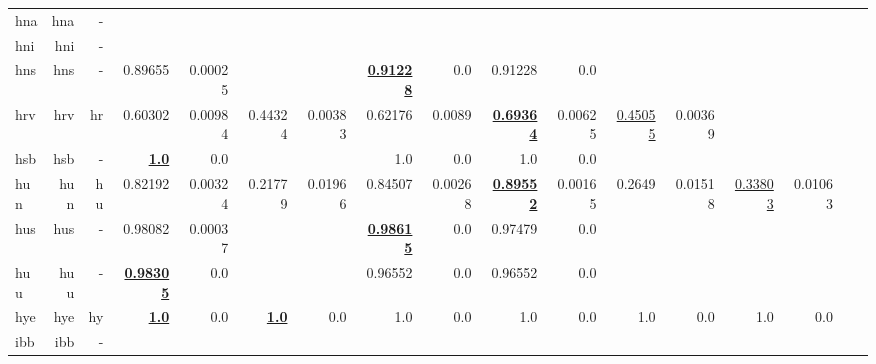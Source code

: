 \documentclass[11pt]{article}
\begin{document}
\begin{table*}[h]
{\begin{tabular}{lrrrrrrrrrrrrrrrr}
hna         & hna         & -         &          &          &          &          &          &          &          &          &          &          &          &          \\
hni         & hni         & -         &          &          &          &          &          &          &          &          &          &          &          &          \\
hns         & hns         & -         & 0.89655         & 0.00025         &          &          & \textbf{\underline{0.91228}}         & 0.0         & 0.91228         & 0.0         &          &          &          &          \\
hrv         & hrv         & hr         & 0.60302         & 0.00984         & 0.44324         & 0.00383         & 0.62176         & 0.0089         & \textbf{\underline{0.69364}}         & 0.00625         & \underline{0.45055}         & 0.00369         &          &          \\
hsb         & hsb         & -         & \textbf{\underline{1.0}}         & 0.0         &          &          & 1.0         & 0.0         & 1.0         & 0.0         &          &          &          &          \\
hun         & hun         & hu         & 0.82192         & 0.00324         & 0.21779         & 0.01966         & 0.84507         & 0.00268         & \textbf{\underline{0.89552}}         & 0.00165         & 0.2649         & 0.01518         & \underline{0.33803}         & 0.01063         \\
hus         & hus         & -         & 0.98082         & 0.00037         &          &          & \textbf{\underline{0.98615}}         & 0.0         & 0.97479         & 0.0         &          &          &          &          \\
huu         & huu         & -         & \textbf{\underline{0.98305}}         & 0.0         &          &          & 0.96552         & 0.0         & 0.96552         & 0.0         &          &          &          &          \\
hye         & hye         & hy         & \textbf{\underline{1.0}}         & 0.0         & \textbf{\underline{1.0}}         & 0.0         & 1.0         & 0.0         & 1.0         & 0.0         & 1.0         & 0.0         & 1.0         & 0.0         \\
ibb         & ibb         & -         &          &          &          &          &          &          &          &          &          &          &          &          \\

\end{tabular}}
\end{table*}
\end{document}
